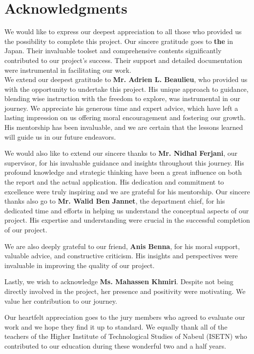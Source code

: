 \section*{Acknowledgments}
We would like to express our deepest appreciation to all those who provided us the possibility to complete this project.
Our sincere gratitude goes to \textbf{the } in Japan. Their invaluable toolset and comprehensive  contents significantly contributed to our project's success. Their support and detailed documentation were instrumental in facilitating our work.\\
We extend our deepest gratitude to \textbf{Mr. Adrien L. Beaulieu}, who provided us with the opportunity to undertake this project. His unique approach to guidance, blending wise instruction with the freedom to explore, was instrumental in our journey. We appreciate his generous time and expert advice, which have left a lasting impression on us offering moral encouragement and fostering our growth. His mentorship has been invaluable, and we are certain that the lessons learned will guide us in our future endeavors.


We would also like to extend our sincere thanks to \textbf{Mr. Nidhal Ferjani}, our supervisor, for his invaluable guidance and insights throughout this journey. His profound knowledge and strategic thinking have been a great influence on both the report and the actual application. His dedication and commitment to excellence were truly inspiring and we are grateful for his mentorship.
Our sincere thanks also go to \textbf{Mr. Walid Ben Jannet}, the department chief, for his dedicated time and efforts in helping us understand the conceptual aspects of our project. His expertise and understanding were crucial in the successful completion of our project.

We are also deeply grateful to our friend, \textbf{Anis Benna}, for his moral support, valuable advice, and constructive criticism. His insights and perspectives were invaluable in improving the quality of our project.

Lastly, we wish to acknowledge \textbf{Ms. Mahassen Khmiri}. Despite not being directly involved in the project, her presence and positivity were motivating. We value her contribution to our journey.

Our heartfelt appreciation goes to the jury members who agreed to evaluate
our work and we hope they find it up to standard. We equally thank all
of the teachers of the Higher Institute of Technological Studies of Nabeul
(ISETN) who contributed to our education during these wonderful two and
a half years.

\begin{figure}[H]
    \label{fig:ThanksInJapanese}
\end{figure}
